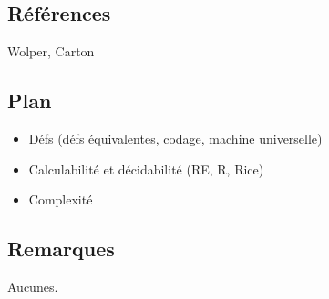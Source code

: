 \documentclass[../../Agregation.tex]{subfiles}
\begin{document}

\dvts

\subsection{Références}

Wolper, Carton

\subsection{Plan}

\begin{itemize}
	\item Défs (défs équivalentes, codage, machine universelle)
	\item Calculabilité et décidabilité (RE, R, Rice)
	\item Complexité
\end{itemize}

\subsection{Remarques}

Aucunes.
\end{document}
